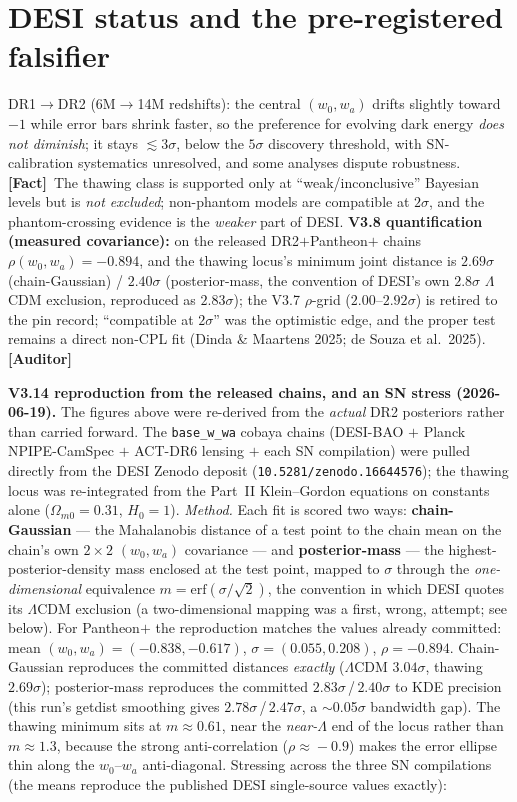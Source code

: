 \documentclass[11pt]{article}
\newcommand{\Fact}{\textbf{\textcolor{green!45!black}{[Fact]}}}
\newcommand{\Auditor}{\textbf{\textcolor{teal!55!black}{[Auditor]}}}
\begin{document}
\section{DESI status and the pre-registered falsifier}
DR1$\to$DR2 (6M$\to$14M redshifts): the central $(w_0,w_a)$ drifts slightly toward $-1$ while error bars shrink faster, so the preference for evolving dark energy \emph{does not diminish}; it stays $\lesssim3\sigma$, below the $5\sigma$ discovery threshold, with SN-calibration systematics unresolved, and some analyses dispute robustness. \Fact\ The thawing class is supported only at ``weak/inconclusive'' Bayesian levels but is \emph{not excluded}; non-phantom models are compatible at $2\sigma$, and the phantom-crossing evidence is the \emph{weaker} part of DESI. \textbf{V3.8 quantification (measured covariance):} on the released DR2$+$Pantheon$+$ chains $\rho(w_0,w_a)=-0.894$, and the thawing locus's minimum joint distance is $2.69\sigma$ (chain-Gaussian) / $2.40\sigma$ (posterior-mass, the convention of DESI's own $2.8\sigma$ $\Lambda$CDM exclusion, reproduced as $2.83\sigma$); the V3.7 $\rho$-grid ($2.00$--$2.92\sigma$) is retired to the pin record; ``compatible at $2\sigma$'' was the optimistic edge, and the proper test remains a direct non-CPL fit (Dinda \& Maartens 2025; de Souza et al.\ 2025). \Auditor

\textbf{V3.14 reproduction from the released chains, and an SN stress (2026-06-19).} The figures above were re-derived from the \emph{actual} DR2 posteriors rather than carried forward. The \texttt{base\_w\_wa} cobaya chains (DESI-BAO $+$ Planck NPIPE-CamSpec $+$ ACT-DR6 lensing $+$ each SN compilation) were pulled directly from the DESI Zenodo deposit (\texttt{10.5281/zenodo.16644576}); the thawing locus was re-integrated from the Part~II Klein--Gordon equations on constants alone ($\Omega_{m0}=0.31$, $H_0=1$). \emph{Method.} Each fit is scored two ways: \textbf{chain-Gaussian} --- the Mahalanobis distance of a test point to the chain mean on the chain's own $2{\times}2$ $(w_0,w_a)$ covariance --- and \textbf{posterior-mass} --- the highest-posterior-density mass enclosed at the test point, mapped to $\sigma$ through the \emph{one-dimensional} equivalence $m=\mathrm{erf}(\sigma/\sqrt2)$, the convention in which DESI quotes its $\Lambda$CDM exclusion (a two-dimensional mapping was a first, wrong, attempt; see below). For Pantheon$+$ the reproduction matches the values already committed: mean $(w_0,w_a)=(-0.838,-0.617)$, $\sigma=(0.055,0.208)$, $\rho=-0.894$. Chain-Gaussian reproduces the committed distances \emph{exactly} ($\Lambda$CDM $3.04\sigma$, thawing $2.69\sigma$); posterior-mass reproduces the committed $2.83\sigma$\,/\,$2.40\sigma$ to KDE precision (this run's getdist smoothing gives $2.78\sigma$\,/\,$2.47\sigma$, a $\sim$0.05$\sigma$ bandwidth gap). The thawing minimum sits at $m\!\approx\!0.61$, near the \emph{near-$\Lambda$} end of the locus rather than $m\!\approx\!1.3$, because the strong anti-correlation ($\rho\!\approx\!-0.9$) makes the error ellipse thin along the $w_0$--$w_a$ anti-diagonal. Stressing across the three SN compilations (the means reproduce the published DESI single-source values exactly):
\end{document}
